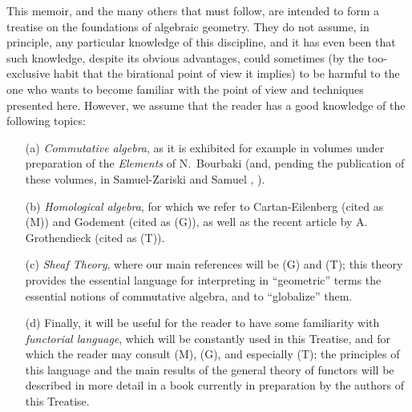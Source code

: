 \documentclass{book}
\begin{document}
This memoir, and the many others that must follow, are intended to
form a treatise on the foundations of algebraic geometry. They do not assume, in
principle, any particular knowledge of this discipline, and it has even been
that such knowledge, despite its obvious advantages, could sometimes (by the
too-exclusive habit that the birational point of view it implies) to be harmful
to the one who wants to become familiar with the point of view and techniques
presented here. However, we assume that the reader has a good knowledge of the
following topics:
\begin{itemize}
  \item[(a)] \emph{Commutative algebra}, as it is exhibited for example in
             volumes under preparation of the \emph{Elements} of N.~Bourbaki
             (and, pending the publication of these volumes, in Samuel-Zariski
             \cite{13} and Samuel \cite{11}, \cite{12}).
  \item[(b)] \emph{Homological algebra}, for which we refer to Cartan-Eilenberg
             \cite{2} (cited as (M)) and Godement \cite{4} (cited as (G)), as well
             as the recent article by A. Grothendieck \cite{6} (cited as (T)).
  \item[(c)] \emph{Sheaf Theory}, where our main references will be (G) and (T);
             this theory provides the essential language for interpreting in
             ``geometric'' terms the essential notions of commutative algebra,
             and to ``globalize'' them.
  \item[(d)] Finally, it will be useful for the reader to have some familiarity with
             \emph{functorial language}, which will be constantly used in this Treatise,
             and for which the reader may consult (M), (G), and especially (T); the
             principles of this language and the main results of the general theory of
             functors will be described in more detail in a book currently in preparation
             by the authors of this Treatise.
\end{itemize}

\asttri
\end{document}
